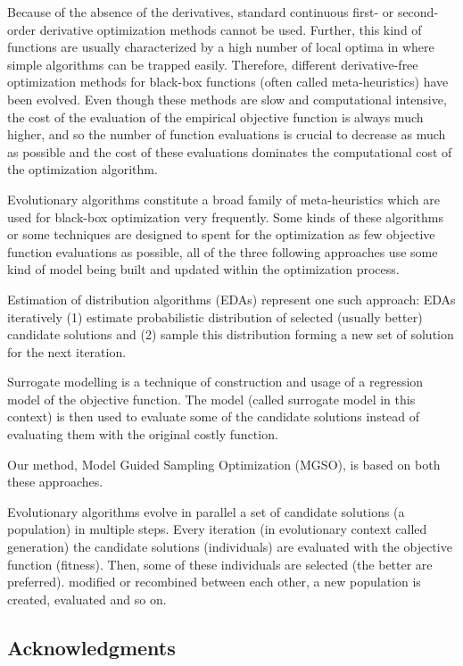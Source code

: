 \documentclass{itatnew}
\begin{document}
Because of the absence of the derivatives, standard continuous first- or second-order derivative optimization methods cannot be used. Further, this kind of functions are usually characterized by a high number of local optima in where simple algorithms can be trapped easily. Therefore, different derivative-free optimization methods for black-box functions (often called meta-heuristics) have been evolved. Even though these methods are slow and computational intensive, the cost of the evaluation of the empirical objective function is always much higher, and so the number of function evaluations is crucial to decrease as much as possible and the cost of these evaluations dominates the computational cost of the optimization algorithm.

Evolutionary algorithms constitute a broad family of meta-heuristics which are used for black-box optimization very frequently. Some kinds of these algorithms or some techniques are designed to spent for the optimization as few objective function evaluations as possible, all of the three following approaches use some kind of model being built and updated within the optimization process.

Estimation of distribution algorithms (EDAs) represent one such approach: EDAs iteratively (1) estimate probabilistic distribution of selected (usually better) candidate solutions and (2) sample this distribution forming a new set of solution for the next iteration. 

Surrogate modelling is a technique of construction and usage of a regression model of the objective function. The model (called surrogate model in this context) is then used to evaluate some of the candidate solutions instead of evaluating them with the original costly function.

Our method, Model Guided Sampling Optimization (MGSO), is based on both these approaches. 


Evolutionary algorithms evolve in parallel a set of candidate solutions (a population) in multiple steps. Every iteration (in evolutionary context called generation) the candidate solutions (individuals) are evaluated with the objective function (fitness). Then, some of these individuals are selected (the better are preferred).  modified or recombined between each other, a new population is created, evaluated and so on.





\subsection*{Acknowledgments}
\end{document}
